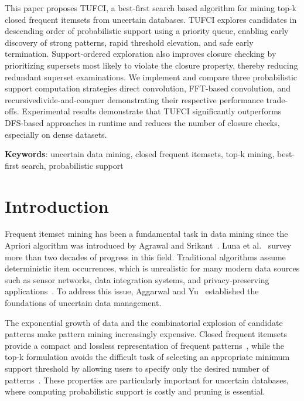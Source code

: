 \documentclass[10pt,letterpaper]{article}
\begin{document}
This paper proposes TUFCI, a best-first search based algorithm for mining
top-k closed frequent itemsets from uncertain databases. TUFCI explores
candidates in descending order of probabilistic support using a priority
queue, enabling early discovery of strong patterns, rapid threshold
elevation, and safe early termination. Support-ordered exploration also
improves closure checking by prioritizing supersets most likely to violate
the closure property, thereby reducing redundant superset examinations. We
implement and compare three probabilistic support computation strategies direct convolution, FFT-based convolution, and recursivedivide-and-conquer demonstrating their respective performance trade-offs. Experimental results demonstrate that TUFCI significantly outperforms DFS-based approaches in runtime and reduces the number of closure checks, especially on dense datasets.

\textbf{Keywords}: uncertain data mining, closed frequent itemsets, top-k
mining, best-first search, probabilistic support

\linenumbers

\section*{Introduction}
Frequent itemset mining has been a fundamental task in data mining since the
Apriori algorithm was introduced by Agrawal and Srikant~\cite{bib1}. Luna
et al.~\cite{bib2} survey more than two decades of progress in this field.
Traditional algorithms assume deterministic item occurrences, which is
unrealistic for many modern data sources such as sensor networks, data
integration systems, and privacy-preserving applications~\cite{bib3}. To
address this issue, Aggarwal and Yu~\cite{bib4} established the foundations
of uncertain data management.

The exponential growth of data and the combinatorial explosion of candidate
patterns make pattern mining increasingly expensive. Closed frequent itemsets
provide a compact and lossless representation of frequent patterns~\cite{bib5},
while the top-k formulation avoids the difficult task of selecting an
appropriate minimum support threshold by allowing users to specify only the
desired number of patterns~\cite{bib6}. These properties are particularly
important for uncertain databases, where computing probabilistic support is
costly and pruning is essential.
\end{document}
